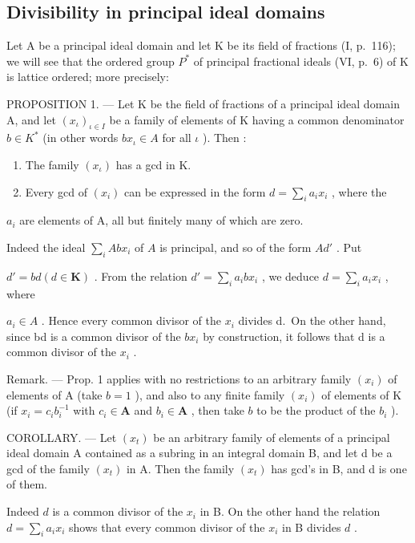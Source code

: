 \subsection{Divisibility in principal ideal domains}

Let A be a principal ideal domain and let K be its field of fractions (I, p.~116); we will see that the ordered group \(P^{*}\) of principal fractional ideals (VI, p.~6) of K is lattice ordered; more precisely:

PROPOSITION 1. --- Let K be the field of fractions of a principal ideal domain A, and let \((x_{\iota})_{\iota \in I}\) be a family of elements of K having a common denominator \(b \in K^{*}\) (in other words \(bx_{\iota} \in A\) for all \(\iota\) ). Then :

\begin{enumerate}
\def\labelenumi{\alph{enumi})}
\item
  The family \((x_{\iota})\) has a gcd in K.
\item
  Every gcd of \((x_{i})\) can be expressed in the form \(d = \sum_{i}a_{i}x_{i}\) , where the
\end{enumerate}

\(a_{i}\) are elements of A, all but finitely many of which are zero.

Indeed the ideal \(\sum_{i} A b x_{i}\) of \(A\) is principal, and so of the form \(A d'\) . Put

\(d' = bd (d \in \mathbf{K})\) . From the relation \(d' = \sum_{i} a_i b x_i\) , we deduce \(d = \sum_{i} a_i x_i\) , where

\(a_{i} \in A\) . Hence every common divisor of the \(x_{i}\) divides d.~On the other hand, since bd is a common divisor of the \(bx_{i}\) by construction, it follows that d is a common divisor of the \(x_{i}\) .

Remark. --- Prop. 1 applies with no restrictions to an arbitrary family \((x_{i})\) of elements of A (take \(b = 1\) ), and also to any finite family \((x_{i})\) of elements of K (if \(x_{i} = c_{i}b_{i}^{-1}\) with \(c_{i} \in \mathbf{A}\) and \(b_{i} \in \mathbf{A}\) , then take \(b\) to be the product of the \(b_{i}\) ).

COROLLARY. --- Let \((x_{t})\) be an arbitrary family of elements of a principal ideal domain A contained as a subring in an integral domain B, and let d be a gcd of the family \((x_{t})\) in A. Then the family \((x_{t})\) has gcd's in B, and d is one of them.

Indeed \(d\) is a common divisor of the \(x_{i}\) in B. On the other hand the relation \(d = \sum_{i} a_{i} x_{i}\) shows that every common divisor of the \(x_{i}\) in B divides \(d\) .

